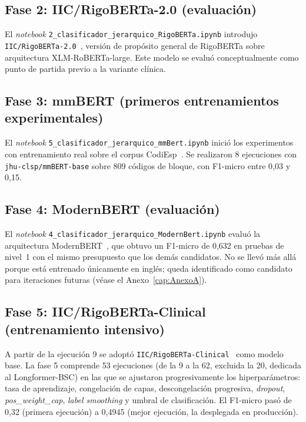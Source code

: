 \subsection{Fase 2: IIC/RigoBERTa-2.0 (evaluación)}

El \emph{notebook} \texttt{2\_clasificador\_jerarquico\_RigoBERTa.ipynb} introdujo \texttt{IIC/RigoBERTa-2.0}~\cite{vacaserrano2022rigoberta}, versión de propósito general de RigoBERTa sobre arquitectura XLM-RoBERTa-large. Este modelo se evaluó conceptualmente como punto de partida previo a la variante clínica.

\subsection{Fase 3: mmBERT (primeros entrenamientos experimentales)}

El \emph{notebook} \texttt{5\_clasificador\_jerarquico\_mmBert.ipynb} inició los experimentos con entrenamiento real sobre el corpus CodiEsp~\cite{miranda2020}. Se realizaron 8 ejecuciones con \texttt{jhu-clsp/mmBERT-base} sobre 809 códigos de bloque, con F1-micro entre 0{,}03 y 0{,}15.

\subsection{Fase 4: ModernBERT (evaluación)}

El \emph{notebook} \texttt{4\_clasificador\_jerarquico\_ModernBert.ipynb} evaluó la arquitectura ModernBERT~\cite{warner2024modernbert}, que obtuvo un F1-micro de 0{,}632 en pruebas de nivel~1 con el mismo presupuesto que los demás candidatos. No se llevó más allá porque está entrenado únicamente en inglés; queda identificado como candidato para iteraciones futuras (véase el Anexo~\ref{cap:AnexoA}).

\subsection{Fase 5: IIC/RigoBERTa-Clinical (entrenamiento intensivo)}

A partir de la ejecución 9 se adoptó \texttt{IIC/RigoBERTa-Clinical}~\cite{garciasubies2026rigobertaclinical} como modelo base. La fase 5 comprende 53 ejecuciones (de la 9 a la 62, excluida la 20, dedicada al Longformer-BSC) en las que se ajustaron progresivamente los hiperparámetros: tasa de aprendizaje, congelación de capas, descongelación progresiva, \emph{dropout}, \emph{pos\_weight\_cap}, \emph{label smoothing} y umbral de clasificación. El F1-micro pasó de 0{,}32 (primera ejecución) a 0{,}4945 (mejor ejecución, la desplegada en producción).

